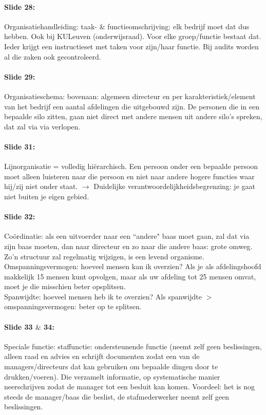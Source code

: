 \documentclass[10pt,a4paper]{report}
\begin{document}
\paragraph{Slide 28:} Organisatiehandleiding: taak- $\&$ functieomschrijving: elk bedrijf moet dat dus hebben. Ook bij KULeuven (onderwijsraad). Voor elke groep/functie bestaat dat. Ieder krijgt een instructieset met taken voor zijn/haar functie. Bij audits worden al die zaken ook gecontroleerd.

\paragraph{Slide 29:} Organisatieschema: bovenaan: algemeen directeur en per karakteristiek/element van het bedrijf een aantal afdelingen die uitgebouwd zijn. De personen die in een bepaalde silo zitten, gaan niet direct met andere mensen uit andere silo's spreken, dat zal via via verlopen.

\paragraph{Slide 31:} Lijnorganisatie = volledig hi\"erarchisch. Een persoon onder een bepaalde persoon moet alleen luisteren naar die persoon en niet naar andere hogere functies waar hij/zij niet onder staat. $\rightarrow$ Duidelijke verantwoordelijkheidsbegrenzing: je gaat niet buiten je eigen gebied.

\paragraph{Slide 32:} Co\"ordinatie: als een uitvoerder naar een ``andere" baas moet gaan, zal dat via zijn baas moeten, dan naar directeur en zo naar die andere baas: grote omweg.
Zo'n structuur zal regelmatig wijzigen, is een levend organisme.\\
Omspanningsvermogen: hoeveel mensen kan ik overzien? Als je als afdelingshoofd makkelijk 15 mensen kunt opvolgen, maar als uw afdeling tot 25 mensen omvat, moet je die misschien beter opsplitsen.\\
Spanwijdte: hoeveel mensen heb ik te overzien? Als spanwijdte $>$ omspanningsvermogen: beter op te splitsen.

\paragraph{Slide 33 $\&$ 34:} Speciale functie: staffunctie: ondersteunende functie (neemt zelf geen beslissingen, alleen raad en advies en schrijft documenten zodat een van de managers/directeurs dat kan gebruiken om bepaalde dingen door te drukken/voeren). Die verzamelt informatie, op systematische manier neerschrijven zodat de manager tot een besluit kan komen. Voordeel: het is nog steeds de manager/baas die beslist, de stafmederwerker neemt zelf geen beslissingen.
\end{document}

